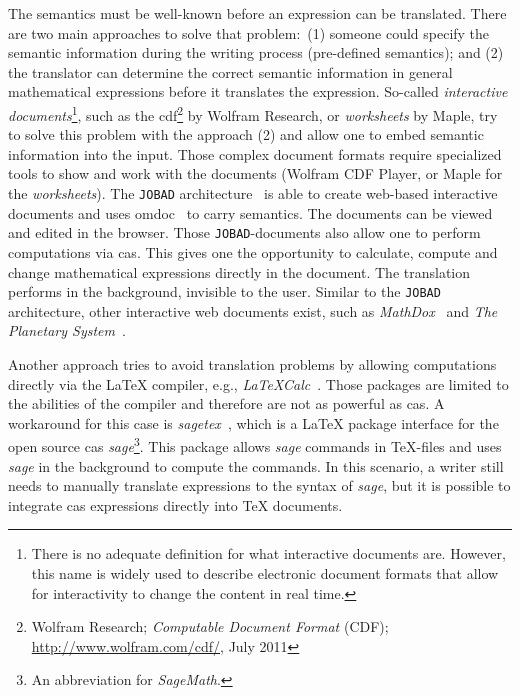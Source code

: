 \documentclass[a4paper,11pt]{article}
\newcommand{\Maple}{Maple}
\newcommand{\JOBAD}{{\tt JOBAD}}
\theoremstyle{defTheoStyle}
\theoremstyle{defExampStyle}
\begin{document}
The semantics must be well-known before an expression can be translated. There are two main approaches to solve that problem:~(1) someone could specify the semantic information during the writing process (pre-defined semantics); and (2) the translator can determine the correct semantic information in general mathematical expressions before it translates the expression. So-called \textit{interactive documents}\footnote{There is no adequate definition for what interactive documents are. However, this name is widely used to describe electronic document formats that allow for interactivity to change the content in real time.}, such as the \gls*{cdf}\footnote{Wolfram Research; \textit{Computable Document Format} (CDF); \url{http://www.wolfram.com/cdf/}, July 2011} by Wolfram Research, or \textit{worksheets} by \Maple{}, try to solve this problem with the approach (2) and allow one to embed semantic information into the input. Those complex document formats require specialized tools to show and work with the documents (Wolfram CDF Player, or \Maple{} for the \textit{worksheets}). The \JOBAD{} architecture~\parencite{JOBAD:orig} is able to create web-based interactive documents and uses \gls*{omdoc}~\parencite{OMDoc} to carry semantics. The documents can be viewed and edited in the browser. Those \JOBAD{-documents} also allow one to perform computations via \gls*{cas}. This gives one the opportunity to calculate, compute and change mathematical expressions directly in the document. The translation performs in the background, invisible to the user. Similar to the \JOBAD{} architecture, other interactive web documents exist, such as \textit{MathDox}~\parencite{MathDox} and \textit{The Planetary System}~\parencite{Planetary}.

Another approach tries to avoid translation problems by allowing computations directly via the \LaTeX{} compiler, e.g., \textit{LaTeXCalc}~\parencite{LatexCalc}. Those packages are limited to the abilities of the compiler and therefore are not as powerful as \gls*{cas}. A workaround for this case is \textit{sagetex}~\parencite{Sagetex}, which is a \LaTeX{} package interface for the open source \gls*{cas} \textit{sage}\footnote{An abbreviation for \textit{SageMath}.}. This package allows \textit{sage} commands in \TeX{-}files and uses \textit{sage} in the background to compute the commands. In this scenario, a writer still needs to manually translate expressions to the syntax of \textit{sage}, but it is possible to integrate \gls*{cas} expressions directly into \TeX{} documents.
\end{document}
